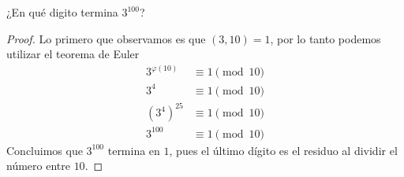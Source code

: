 \documentclass[main.tex]{subfiles}
\begin{document}
\begin{example}
    ¿En qu\'e digito termina $3^{100}$?
\end{example}

\begin{proof}
    Lo primero que observamos es que $(3, 10) = 1$, por lo tanto podemos utilizar el teorema de Euler
    \begin{align*}
        3^{\varphi(10)}&\equiv 1\pmod{10}\\
        3^4&\equiv 1\pmod{10}\\
        (3^4)^{25}&\equiv 1\pmod{10}\\
        3^{100}&\equiv 1\pmod{10}
    \end{align*}
    Concluimos que $3^{100}$ termina en $1$, pues el \'ultimo d\'igito es el residuo al dividir el n\'umero entre $10$.
\end{proof}
\end{document}
